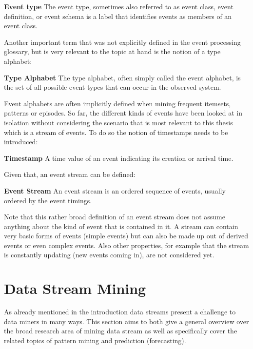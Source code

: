\begin{mydef}
\textbf{Event type} The event type, sometimes also referred to as event class, event definition, or event schema is a label that identifies events as members of an event class.
\end{mydef}

Another important term that was not explicitly defined in the event processing glossary, but is very relevant to the topic at hand is the notion of a type alphabet:

\begin{mydef}
\textbf{Type Alphabet} The type alphabet, often simply called the event alphabet, is the set of all possible event types that can occur in the observed system.
\end{mydef}

Event alphabets are often implicitly defined when mining frequent itemsets, patterns or episodes. So far, the different kinds of events have been looked at in isolation without considering the scenario that is most relevant to this thesis which is a stream of events. To do so the notion of timestamps needs to be introduced:

\begin{mydef}
\textbf{Timestamp} A time value of an event indicating its creation or arrival time.
\end{mydef}

Given that, an event stream can be defined:

\begin{mydef}
\textbf{Event Stream} An event stream is an ordered sequence of events, usually ordered by the event timings.
\end{mydef}

Note that this rather broad definition of an event stream does not assume anything about the kind of event that is contained in it. A stream can contain very basic forms of events (simple events) but can also be made up out of derived events or even complex events. Also other properties, for example that the stream is constantly updating (new events coming in), are not considered yet.


\section{Data Stream Mining}
\label{sec_streamMining}
As already mentioned in the introduction data streams present a challenge to data miners in many ways. This section aims to both give a general overview over the broad research area of mining data stream as well as specifically cover the related topics of pattern mining and prediction (forecasting). \\

